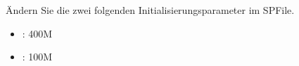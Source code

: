       \item Ändern Sie die zwei folgenden Initialisierungsparameter im SPFile.
        \begin{itemize}
          \item {}: 400M
          \item {}: 100M
        \end{itemize}
